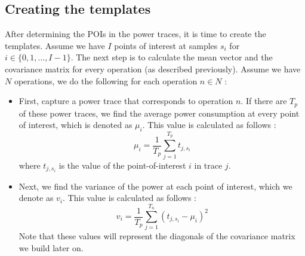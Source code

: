 \subsection{Creating the templates}
After determining the POIs in the power traces, it is time to create the templates.
Assume we have $I$ points of interest at samples $s_i$ for $i \in \{0, 1, \ldots, I - 1 \}$.
The next step is to calculate the mean vector and the covariance matrix for every operation (as described previously).
Assume we have $N$ operations, we do the following for each operation $n \in N$ \cite{whisperer2018template, rechberger2004practical}:
%
\begin{itemize}
	\item First, capture a power trace that corresponds to operation $n$.
	If there are $T_p$ of these power traces, we find the average power consumption at every point of interest, which is denoted as $\mu_i$. This value is calculated as follows \cite{rechberger2004practical}:
	\begin{equation*}
	\mu_i = \frac{1}{T_p} \sum_{j = 1}^{T_p} t_{j, s_i}
	\end{equation*}
	where $t_{j, s_i}$ is the value of the point-of-interest $i$ in trace $j$.
	
	\item Next, we find the variance of the power at each point of interest, which we denote as $v_i$. This value is calculated as follows \cite{whisperer2018template}:
	\begin{equation*}
	v_i = \frac{1}{T_p} \sum_{j = 1}^{T_n} ( t_{j, s_i} - \mu_i)^2
	\end{equation*}
	Note that these values will represent the diagonals of the covariance matrix we build later on.
	

\end{itemize}
